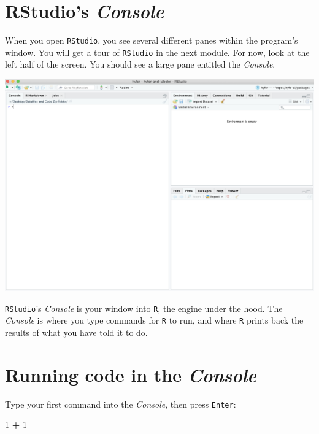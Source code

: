 \documentclass[
]{book}
\newenvironment{Shaded}{\begin{snugshade}}{\end{snugshade}}
\newcommand{\DecValTok}[1]{\textcolor[rgb]{0.00,0.00,0.81}{#1}}
\newcommand{\OperatorTok}[1]{\textcolor[rgb]{0.81,0.36,0.00}{\textbf{#1}}}
\newcommand{\StringTok}[1]{\textcolor[rgb]{0.31,0.60,0.02}{#1}}
\begin{document}
\hypertarget{rstudios-console}{%
\section*{\texorpdfstring{RStudio's \emph{Console}}{RStudio's Console}}\label{rstudios-console}}

When you open \texttt{RStudio}, you see several different panes within the program's window. You will get a tour of \texttt{RStudio} in the next module. For now, look at the left half of the screen. You should see a large pane entitled the \emph{Console}.

\includegraphics{img/rstudio_firstopen.png}

\texttt{RStudio}'s \emph{Console} is your window into \texttt{R}, the engine under the hood. The \emph{Console} is where you type commands for \texttt{R} to run, and where \texttt{R} prints back the results of what you have told it to do.

\hypertarget{running-code-in-the-console}{%
\section*{\texorpdfstring{Running code in the \emph{Console}}{Running code in the Console}}\label{running-code-in-the-console}}

Type your first command into the \emph{Console}, then press \texttt{Enter}:

\begin{Shaded}
\begin{Highlighting}[]
\DecValTok{1} \OperatorTok{+}\StringTok{ }\DecValTok{1}
\end{Highlighting}
\end{Shaded}
\end{document}
